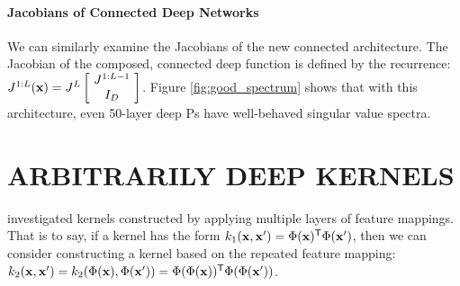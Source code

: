 \documentclass[twoside]{article}
\makeatletter
\newlength{\nonHumbleHeight}
\def\@humbleformat#1{{\settoheight{\nonHumbleHeight}{#1}\resizebox{!}{0.94\nonHumbleHeight}{#1}}}%
\def\humble#1{\@humbleformat{#1}}%
\newcommand{\gp}{{\humble GP}}
\newcommand{\sectiondist}{}
\makeatother
\begin{document}
\paragraph{Jacobians of Connected Deep Networks}

We can similarly examine the Jacobians of the new connected architecture.  
The Jacobian of the composed, connected deep function is defined by the recurrence:
%
\newcommand{\sbi}[2]{\left[ \! \begin{array}{c} #1 \\ #2 \end{array} \! \right]} 
$J^{1:L}(\vx) = J^L \sbi{ J^{1:L-1}}{I_D}$.
%
%
%
Figure \ref{fig:good_spectrum} shows that with this architecture, even 50-layer deep \gp{}s have well-behaved singular value spectra.






\section{ARBITRARILY DEEP KERNELS}
\sectiondist
\vspace{-0.08in}

\cite{cho2012kernel} investigated kernels constructed by applying multiple layers of feature mappings.  That is to say, if a kernel has the form $k_1({\bf{x}}, {\bf{x}}') = \Phi({\bf{x}}) {^\mathsf{T}} \Phi({\bf{x}}')$, then we can consider constructing a kernel based on the repeated feature mapping: $k_2({\bf{x}}, {\bf{x}}') = k_2(\Phi({\bf{x}}), \Phi({\bf{x}}')) = \Phi(\Phi({\bf{x}})) {^\mathsf{T}} \Phi(\Phi({\bf{x}}'))$.
%
\end{document}
